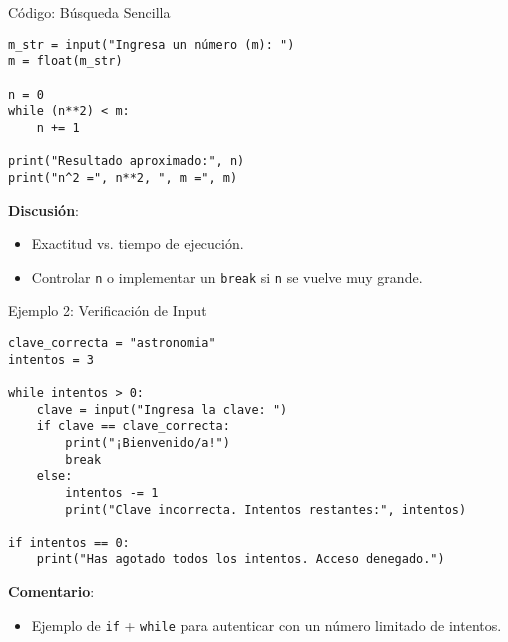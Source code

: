 \documentclass[10pt]{beamer}
\begin{document}
\begin{frame}[fragile]{Código: Búsqueda Sencilla}
\begin{verbatim}
m_str = input("Ingresa un número (m): ")
m = float(m_str)

n = 0
while (n**2) < m:
    n += 1

print("Resultado aproximado:", n)
print("n^2 =", n**2, ", m =", m)
\end{verbatim}
\textbf{Discusión}:
\begin{itemize}
  \item Exactitud vs. tiempo de ejecución.
  \item Controlar \texttt{n} o implementar un \texttt{break} si \texttt{n} se vuelve muy grande.
\end{itemize}
\end{frame}

\begin{frame}[fragile]{Ejemplo 2: Verificación de Input}
\begin{verbatim}
clave_correcta = "astronomia"
intentos = 3

while intentos > 0:
    clave = input("Ingresa la clave: ")
    if clave == clave_correcta:
        print("¡Bienvenido/a!")
        break
    else:
        intentos -= 1
        print("Clave incorrecta. Intentos restantes:", intentos)

if intentos == 0:
    print("Has agotado todos los intentos. Acceso denegado.")
\end{verbatim}
\textbf{Comentario}:
\begin{itemize}
  \item Ejemplo de \texttt{if} + \texttt{while} para autenticar con un número limitado de intentos.
\end{itemize}
\end{frame}
\end{document}
